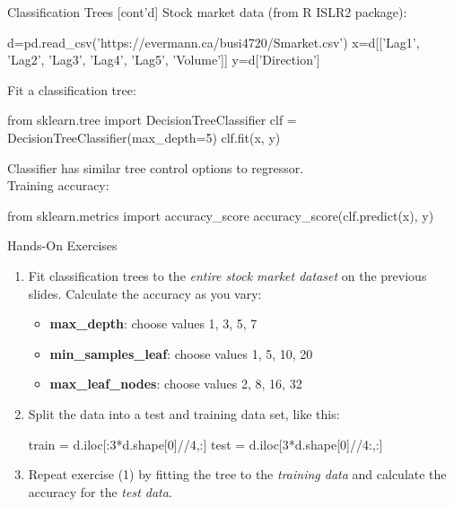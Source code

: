 \documentclass[ignorenonframetext,xcolor=x11names]{beamer}
\begin{document}
\begin{frame}[fragile]{Classification Trees \small [cont'd]}
Stock market data (from R ISLR2 package):
\begin{pythoncode}
d=pd.read_csv('https://evermann.ca/busi4720/Smarket.csv')
x=d[['Lag1', 'Lag2', 'Lag3', 'Lag4', 'Lag5', 'Volume']]
y=d['Direction']
\end{pythoncode}
Fit a classification tree:
\begin{pythoncode}
from sklearn.tree import DecisionTreeClassifier
clf = DecisionTreeClassifier(max_depth=5)
clf.fit(x, y)
\end{pythoncode}
Classifier has similar tree control options to regressor. \\

Training accuracy:
\begin{pythoncode}
from sklearn.metrics import accuracy_score
accuracy_score(clf.predict(x), y)
\end{pythoncode}
\end{frame}

\begin{frame}[fragile]{Hands-On Exercises}
\begin{enumerate}
\item Fit classification trees to the \emph{entire stock market dataset} on the previous slides. Calculate the accuracy as you vary:
\begin{itemize}
   \item \textbf{max\_depth}: choose values 1, 3, 5, 7
   \item \textbf{min\_samples\_leaf}: choose values 1, 5, 10, 20
   \item \textbf{max\_leaf\_nodes}: choose values 2, 8, 16, 32
\end{itemize}
\item Split the data into a test and training data set, like this:
\begin{pythoncode}
train = d.iloc[:3*d.shape[0]//4,:]
test = d.iloc[3*d.shape[0]//4:,:]
\end{pythoncode}
\item Repeat exercise (1) by fitting the tree to the \emph{training data} and calculate the accuracy for the \emph{test data}.
\end{enumerate}
\end{frame}
\end{document}

